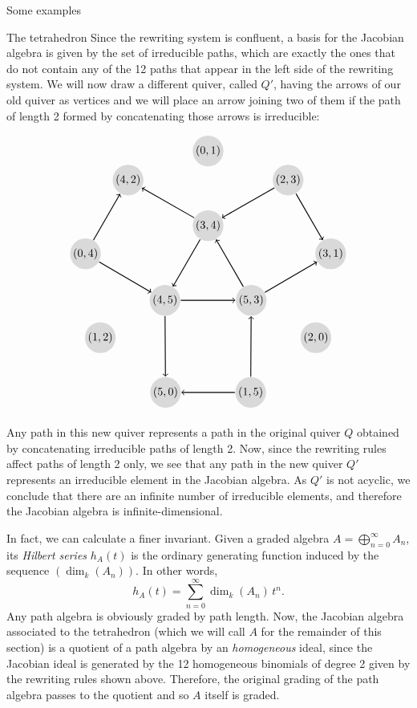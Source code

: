 \begin{chapter}{Some examples}
\begin{section}{The tetrahedron}
Since the rewriting system is confluent, a basis for the Jacobian algebra is given by the set of irreducible paths, which are exactly the ones that do not contain any of the 12 paths that appear in the left side of the rewriting system. We will now draw a different quiver, called $Q'$, having the arrows of our old quiver as vertices and we will place an arrow joining two of them if the path of length 2 formed by concatenating those arrows is irreducible:

\[
\begin{tikzpicture}[->, thick, scale=1.3]
\tikzstyle{every node} = [circle, fill=gray!30, minimum size=.5cm, inner sep=.04cm]
\node (1) at (90:1.2) {$(3,4)$};
\node (2) at (210:1.2) {$(4,5)$};
\node (3) at (330:1.2) {$(5,3)$};
\node (4) at (10:3) {$(3,1)$};
\node (5) at (50:3) {$(2,3)$};
\node (6) at (130:3) {$(4,2)$};
\node (7) at (170:3) {$(0,4)$};
\node (8) at (250:3) {$(5,0)$};
\node (9) at (290:3) {$(1,5)$};
\node (10) at (90:3) {$(0,1)$};
\node (11) at (210:3) {$(1,2)$};
\node (12) at (330:3) {$(2,0)$};
\tikzstyle{every node} = []
\draw (1) -- (2);
\draw (2) -- (3);
\draw (3) -- (1);
\draw (3) -- (4);
\draw (5) -- (4);
\draw (5) -- (1);
\draw (1) -- (6);
\draw (7) -- (6);
\draw (7) -- (2);
\draw (9) -- (8);
\draw (9) -- (3);
\draw (2) -- (8);
\end{tikzpicture}
\]

Any path in this new quiver represents a path in the original quiver $Q$ obtained by concatenating irreducible paths of length 2. Now, since the rewriting rules affect paths of length 2 only, we see that any path in the new quiver $Q'$ represents an irreducible element in the Jacobian algebra. As $Q'$ is not acyclic, we conclude that there are an infinite number of irreducible elements, and therefore the Jacobian algebra is infinite-dimensional.

In fact, we can calculate a finer invariant. Given a graded algebra $A=\bigoplus_{n=0}^\infty A_n$, its \emph{Hilbert series} $h_A(t)$ is the ordinary generating function induced by the sequence $(\dim_k(A_n))$. In other words,
\[h_A(t) = \sum_{n=0}^\infty \dim_k(A_n)\,t^n.\]
Any path algebra is obviously graded by path length. Now, the Jacobian algebra associated to the tetrahedron (which we will call $A$ for the remainder of this section) is a quotient of a path algebra by an \emph{homogeneous} ideal, since the Jacobian ideal is generated by the 12 homogeneous binomials of degree 2 given by the rewriting rules shown above. Therefore, the original grading of the path algebra passes to the quotient and so $A$ itself is graded. 


\end{section}
\end{chapter}
